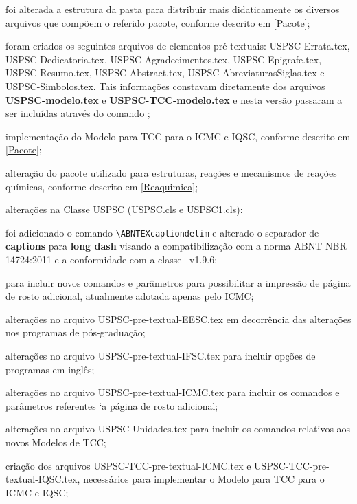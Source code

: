 \begin{alineas}	 
	\item foi alterada a estrutura da pasta para distribuir mais didaticamente os diversos arquivos que compõem o referido pacote, conforme descrito em \ref{Pacote}; 
	\item foram criados os seguintes arquivos de elementos pr\'e-textuais: USPSC-Errata.tex, USPSC-Dedicatoria.tex, USPSC-Agradecimentos.tex, USPSC-Epigrafe.tex,\\
	USPSC-Resumo.tex, USPSC-Abstract.tex, USPSC-AbreviaturasSiglas.tex e USPSC-Simbolos.tex. 
	Tais informações constavam diretamente dos arquivos \textbf{USPSC-modelo.tex} e  \textbf{USPSC-TCC-modelo.tex} e nesta versão passaram a ser incluídas atrav\'es do comando \verb++;
	\item implementação do Modelo para TCC para o ICMC e IQSC, conforme descrito em \ref{Pacote};
	\item alteração do pacote utilizado para estruturas, reações e mecanismos de reações químicas, conforme descrito em \ref{Reaquimica};
	\item alterações na Classe USPSC (USPSC.cls e USPSC1.cls):
		\begin{subalineas}
			\item foi adicionado o comando \verb+\ABNTEXcaptiondelim+ e alterado o separador de \textbf{captions} para \textbf{long dash} visando a compatibilização com a norma  ABNT NBR 14724:2011 e a conformidade com a classe \abnTeX\ v1.9.6;
			\item para incluir novos comandos e par\^ametros para possibilitar a impressão de p\'agina de rosto adicional, atualmente adotada apenas pelo ICMC;
		\end{subalineas}
	\item alterações no arquivo USPSC-pre-textual-EESC.tex em decorr\^encia das alterações nos programas de pós-graduação;
	\item alterações no arquivo USPSC-pre-textual-IFSC.tex para incluir opções de programas em ingl\^es;
	\item alterações no arquivo USPSC-pre-textual-ICMC.tex para incluir os comandos e par\^ametros referentes `a p\'agina de rosto adicional;
	\item alterações no arquivo USPSC-Unidades.tex para incluir os comandos relativos aos novos Modelos de TCC;
	\item criação dos arquivos USPSC-TCC-pre-textual-ICMC.tex e USPSC-TCC-pre-textual-IQSC.tex, necess\'arios para implementar o Modelo para TCC para o ICMC e IQSC;

\end{alineas}
